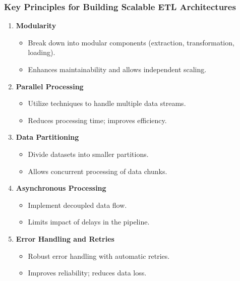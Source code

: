 \documentclass{beamer}
\begin{document}
\begin{frame}[fragile]
    \frametitle{Key Principles for Building Scalable ETL Architectures}
    \begin{enumerate}
        \item \textbf{Modularity}
            \begin{itemize}
                \item Break down into modular components (extraction, transformation, loading).
                \item Enhances maintainability and allows independent scaling.
            \end{itemize}

        \item \textbf{Parallel Processing}
            \begin{itemize}
                \item Utilize techniques to handle multiple data streams.
                \item Reduces processing time; improves efficiency.
            \end{itemize}
        
        \item \textbf{Data Partitioning}
            \begin{itemize}
                \item Divide datasets into smaller partitions.
                \item Allows concurrent processing of data chunks.
            \end{itemize}

        \item \textbf{Asynchronous Processing}
            \begin{itemize}
                \item Implement decoupled data flow.
                \item Limits impact of delays in the pipeline.
            \end{itemize}
        
        \item \textbf{Error Handling and Retries}
            \begin{itemize}
                \item Robust error handling with automatic retries.
                \item Improves reliability; reduces data loss.
            \end{itemize}
        

\end{enumerate}
\end{frame}
\end{document}
